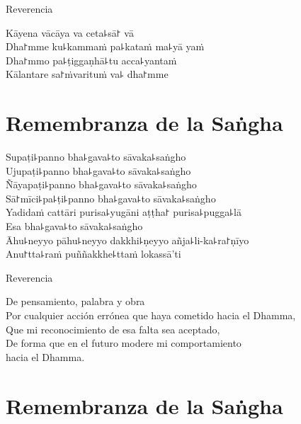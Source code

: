 \clearpage

\begin{instruction}
  Reverencia
\end{instruction}

Kāyena vācāya va ceta꜕sā꜓ vā\\
Dha꜓mme ku꜕kammaṁ pa꜕kataṁ ma꜕yā yaṁ\\
Dha꜓mmo pa꜕ṭiggaṇhā꜕tu acca꜕yantaṁ\\
Kālantare sa꜓ṁvarituṁ va꜕ dha꜓mme

\chapter*{Remembranza de la Saṅgha}

\delegateSetUseNext

\begin{leader}
\end{leader}

Supaṭi꜕panno bha꜕gava꜕to sāvaka꜕saṅgho\\
Ujupaṭi꜕panno bha꜕gava꜕to sāvaka꜕saṅgho\\
Ñāyapaṭi꜕panno bha꜕gava꜕to sāvaka꜕saṅgho\\
Sā꜓mīci꜕pa꜕ṭi꜕panno bha꜕gava꜕to sāvaka꜕saṅgho\\
Yadidaṁ cattāri purisa꜕yugāni aṭṭha꜓ purisa꜕pugga꜕lā\\
Esa bha꜕gava꜕to sāvaka꜕saṅgho\\
Āhu꜕neyyo pāhu꜕neyyo dakkhi꜕ṇeyyo añja꜕li-ka꜕ra꜓ṇīyo\\
Anu꜓tta꜕raṁ puññakkhe꜕ttaṁ lokassā'ti

\clearpage

\begin{instruction}
  Reverencia
\end{instruction}

De pensamiento, palabra y obra\\
Por cualquier acción errónea que haya cometido hacia el Dhamma,\\
Que mi reconocimiento de esa falta sea aceptado,\\
De forma que en el futuro modere mi comportamiento\\
\vin hacia el Dhamma.

\chapter{Remembranza de la Saṅgha}

\begin{leader}
\end{leader}

